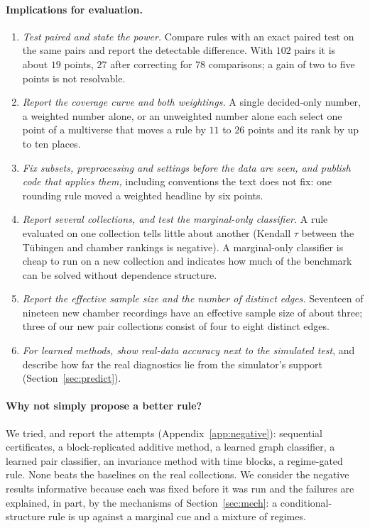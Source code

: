 \paragraph{Implications for evaluation.}
\begin{enumerate}
\item \emph{Test paired and state the power.} Compare rules with an exact paired test on the same pairs and report the detectable difference. With $102$ pairs it is about $19$ points, $27$ after correcting for $78$ comparisons; a gain of two to five points is not resolvable.
\item \emph{Report the coverage curve and both weightings.} A single decided-only number, a weighted number alone, or an unweighted number alone each select one point of a multiverse that moves a rule by $11$ to $26$ points and its rank by up to ten places.
\item \emph{Fix subsets, preprocessing and settings before the data are seen, and publish code that applies them,} including conventions the text does not fix: one rounding rule moved a weighted headline by six points.
\item \emph{Report several collections, and test the marginal-only classifier.} A rule evaluated on one collection tells little about another (Kendall $\tau$ between the T\"ubingen and chamber rankings is negative). A marginal-only classifier is cheap to run on a new collection and indicates how much of the benchmark can be solved without dependence structure.
\item \emph{Report the effective sample size and the number of distinct edges.} Seventeen of nineteen new chamber recordings have an effective sample size of about three; three of our new pair collections consist of four to eight distinct edges.
\item \emph{For learned methods, show real-data accuracy next to the simulated test}, and describe how far the real diagnostics lie from the simulator's support (Section~\ref{sec:predict}).
\end{enumerate}

\paragraph{Why not simply propose a better rule?} We tried, and report the attempts (Appendix~\ref{app:negative}): sequential certificates, a block-replicated additive method, a learned graph classifier, a learned pair classifier, an invariance method with time blocks, a regime-gated rule. None beats the baselines on the real collections. We consider the negative results informative because each was fixed before it was run and the failures are explained, in part, by the mechanisms of Section~\ref{sec:mech}: a conditional-structure rule is up against a marginal cue and a mixture of regimes.

